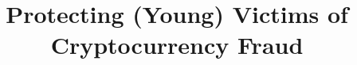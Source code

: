 \documentclass{epsrc}
\newcommand{\1}{1}
\newcommand{\2}{2}
\newcommand{\3}{3}
\newcommand{\4}{4}
\begin{document}
%
\newcommand{\printcntr}{%
  \stepcounter{mycounter}%
  \padzeroes[1]{\decimal{mycounter}}%
}

%
\title{Protecting (Young) Victims of Cryptocurrency Fraud}
\author{}
\date{}
\maketitle  
\vspace{-21mm}
\begin{multicols}{2}







%















%
%

\end{multicols}
\end{document}
